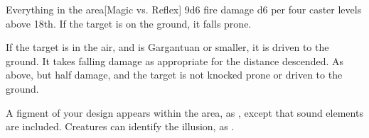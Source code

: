 \spellrng{\rnglong}
\begin{spelltargets}{Everything in the area}[Magic vs. Reflex]
    \spellsuccess 9d6 fire damage \add d6 per four caster levels above 18th. If the target is on the ground, it falls prone.

    If the target is in the air, and is Gargantuan or smaller, it is driven to the ground. It takes falling damage as appropriate for the distance descended.
    \spellfailure As above, but half damage, and the target is not knocked prone or driven to the ground.
\end{spelltargets}
\spellnotes \firespellnotes

\destructivespellnotes

\spelldur{\durshort}
\spellline
\spelleffect A figment of your design appears within the area, as , except that sound elements are included.
\spellnotes Creatures can identify the illusion, as .

